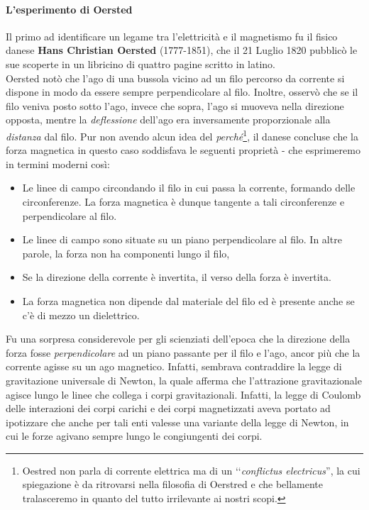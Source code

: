 \paragraph{L'esperimento di Oersted}
Il primo ad identificare un legame tra l'elettricità e il magnetismo fu il fisico danese \textbf{Hans Christian Oersted} (1777-1851), che il 21 Luglio 1820 pubblicò le sue scoperte in un libricino di quattro pagine scritto in latino.\\
Oersted notò che l'ago di una bussola vicino ad un filo percorso da corrente si dispone in modo da essere sempre perpendicolare al filo. Inoltre, osservò che se il filo veniva posto sotto l'ago, invece che sopra, l'ago si muoveva nella direzione opposta, mentre la \textit{deflessione} dell'ago era inversamente proporzionale alla \textit{distanza} dal filo.
Pur non avendo alcun idea del \textit{perché}\footnote{Oestred non parla di corrente elettrica ma di un ‘‘\textit{conflictus electricus}'', la cui spiegazione è da ritrovarsi nella filosofia di Oerstred e che bellamente tralasceremo in quanto del tutto irrilevante ai nostri scopi.}, il danese concluse che la forza magnetica in questo caso soddisfava le seguenti proprietà - che esprimeremo in termini moderni così: %
\begin{itemize}
	\item Le linee di campo circondando il filo in cui passa la corrente, formando delle circonferenze. La forza magnetica è dunque tangente a tali circonferenze e perpendicolare al filo.
	\item Le linee di campo sono situate su un piano perpendicolare al filo. In altre parole, la forza non ha componenti lungo il filo,
	\item Se la direzione della corrente è invertita, il verso della forza è invertita.
	\item La forza magnetica non dipende dal materiale del filo ed è presente anche se c'è di mezzo un dielettrico.
\end{itemize} 
\begin{digression}
	Fu una sorpresa considerevole per gli scienziati dell'epoca che la direzione della forza fosse \textit{perpendicolare} ad un piano passante per il filo e l'ago, ancor più che la corrente agisse su un ago magnetico. Infatti, sembrava contraddire la legge di gravitazione universale di Newton, la quale afferma che l'attrazione gravitazionale agisce lungo le linee che collega i corpi gravitazionali. Infatti, la legge di Coulomb delle interazioni dei corpi carichi e dei corpi magnetizzati aveva portato ad ipotizzare che anche per tali enti valesse una variante della legge di Newton, in cui le forze agivano sempre lungo le congiungenti dei corpi.
\end{digression}
